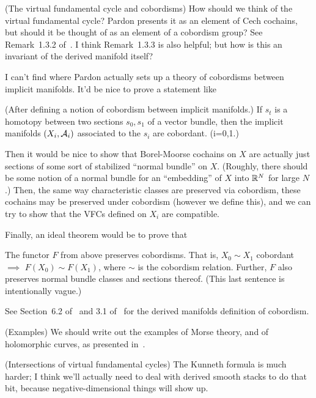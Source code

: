 			\enumd
	\item (The virtual fundamental cycle and cobordisms)
		How should we think of the virtual fundamental cycle? Pardon presents it as an element of Cech cochains, but should it be thought of as an element of a cobordism group? See Remark~1.3.2 of~\cite{pardon}. I think Remark~1.3.3 is also helpful; but how is this an invariant of the derived manifold itself?
			\enum
				\item
					I can't find where Pardon actually sets up a theory of cobordisms between implicit manifolds. It'd be nice to prove a statement like
					\begin{theorem}
					(After defining a notion of cobordism between implicit manifolds.) If $s_t$ is a homotopy between two sections $s_0, s_1$ of a vector bundle, then the implicit manifolds $(X_i, \mathcal A_i)$ associated to the $s_i$ are cobordant. (i=0,1.)
					\end{theorem}
				\item
					Then it would be nice to show that Borel-Moorse cochains on $X$ are actually just sections of some sort of stabilized ``normal bundle'' on $X$. (Roughly, there should be some notion of a normal bundle for an ``embedding'' of $X$ into $\mathbb R^N$ for large $N$.) Then, the same way characteristic classes are preserved via cobordism, these cochains may be preserved under cobordism (however we define this), and we can try to show that the VFCs defined on $X_i$ are compatible.
				\item
					Finally, an ideal theorem would be to prove that 
					\begin{theorem}
						The functor $F$ from above preserves cobordisms. That is, $X_0 \sim X_1$ cobordant $\implies$ $F(X_0) \sim F(X_1)$, where $\sim$ is the cobordism relation. Further, $F$ also preserves normal bundle classes and sections thereof. (This last sentence is intentionally vague.)
					\end{theorem}
					See Section~6.2 of~\cite{spivak-thesis} and 3.1 of~\cite{spivak} for the derived manifolds definition of cobordism.
			\enumd
	\item (Examples)
		We should write out the examples of Morse theory, and of holomorphic curves, as presented in~\cite{pardon}.
	\item (Intersections of virtual fundamental cycles)
		The Kunneth formula is much harder; I think we'll actually need to deal with derived smooth stacks to do that bit, because negative-dimensional things will show up.
		
\enumd



